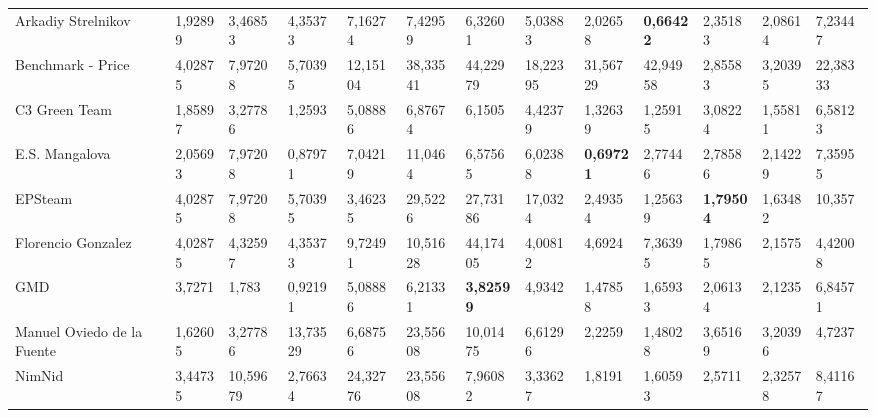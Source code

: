 \begin{table}[!ht]
\begin{adjustbox}{width=\textwidth}
\begin{tabular}{lllllllllllll}
  Arkadiy Strelnikov         & 1,92899          & 3,46853          & 4,35373          & 7,16274          & 7,42959          & 6,32601          & 5,03883          & 2,02658          & \textbf{0,66422} & 2,35183          & 2,08614          & 7,23447          \\
  Benchmark - Price          & 4,02875          & 7,97208          & 5,70395          & 12,15104         & 38,33541         & 44,22979         & 18,22395         & 31,56729         & 42,94958         & 2,85583          & 3,20395          & 22,38333         \\
  C3 Green Team              & 1,85897          & 3,27786          & 1,2593           & 5,08886          & 6,87674          & 6,1505           & 4,42379          & 1,32639          & 1,25915          & 3,08224          & 1,55811          & 6,58123          \\
  E.S. Mangalova             & 2,05693          & 7,97208          & 0,87971          & 7,04219          & 11,0464          & 6,57565          & 6,02388          & \textbf{0,69721} & 2,77446          & 2,78586          & 2,14229          & 7,35955          \\
  EPSteam                    & 4,02875          & 7,97208          & 5,70395          & 3,46235          & 29,5226          & 27,73186         & 17,0324          & 2,49354          & 1,25639          & \textbf{1,79504} & 1,63482          & 10,357           \\
  Florencio Gonzalez         & 4,02875          & 4,32597          & 4,35373          & 9,72491          & 10,51628         & 44,17405         & 4,00812          & 4,6924           & 7,36395          & 1,79865          & 2,1575           & 4,42008          \\
  GMD                        & 3,7271           & 1,783            & 0,92191          & 5,08886          & 6,21331          & \textbf{3,82599} & 4,9342           & 1,47858          & 1,65933          & 2,06134          & 2,1235           & 6,84571          \\
  Manuel Oviedo de la Fuente & 1,62605 & 3,27786          & 13,73529         & 6,68756          & 23,55608         & 10,01475         & 6,61296          & 2,2259           & 1,48028          & 3,65169          & 3,20396          & 4,7237           \\
  NimNid                     & 3,44735          & 10,59679         & 2,76634          & 24,32776         & 23,55608         & 7,96082          & 3,33627          & 1,8191           & 1,60593          & 2,5711           & 2,32578          & 8,41167          \\

\end{tabular}
\end{adjustbox}
\end{table}
